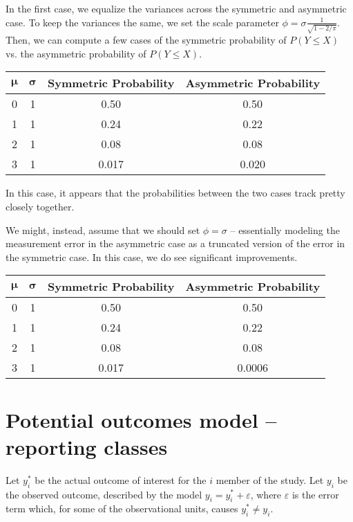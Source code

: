 \documentclass{article}
\begin{document}
In the first case, we equalize the variances across the symmetric and asymmetric case. To keep the variances the same, we set the scale parameter $\phi = \sigma \frac{1}{\sqrt{1 - 2/\pi}}$. Then, we can compute a few cases of the symmetric probability of $P(Y \leq X)$ vs. the asymmetric probability of $P(Y \leq X)$. 

\begin{table}[h]
\begin{tabular}{|c|c|c|c|} \hline
$\boldsymbol{\mu}$ & $\boldsymbol{\sigma}$  & \textbf{Symmetric Probability} &  \textbf{Asymmetric Probability}  \\ \hline
0 & 1 & 0.50 &  0.50  \\ \hline
1 & 1 & 0.24 &  0.22  \\ \hline
2 & 1 & 0.08 & 0.08  \\  \hline
3 & 1 & 0.017 &  0.020  \\ \hline
\end{tabular}
\end{table}
In this case, it appears that the probabilities between the two cases track pretty closely together. 

We might, instead, assume that we should set $\phi = \sigma$ -- essentially modeling the measurement error in the asymmetric case as a truncated version of the error in the symmetric case. In this case, we do see significant improvements. 

\begin{table}[h]
\begin{tabular}{|c|c|c|c|} \hline
$\boldsymbol{\mu}$ & $\boldsymbol{\sigma}$  & \textbf{Symmetric Probability} &  \textbf{Asymmetric Probability}  \\ \hline
0 & 1 & 0.50 &  0.50  \\ \hline
1 & 1 & 0.24 &  0.22  \\ \hline
2 & 1 & 0.08 & 0.08  \\  \hline
3 & 1 & 0.017 &  0.0006  \\ \hline
\end{tabular}
\end{table}



\section{Potential outcomes model -- reporting classes}
\label{sec:model}

Let $y^{*}_i$ be the actual outcome of interest for the $i$ member of the study. Let $y_i$ be the observed outcome, described by the model $y_i = y^{*}_i + \varepsilon$, where $\varepsilon$ is the error term which, for some of the observational units, causes $y^{*}_i \neq y_i$.
\end{document}
